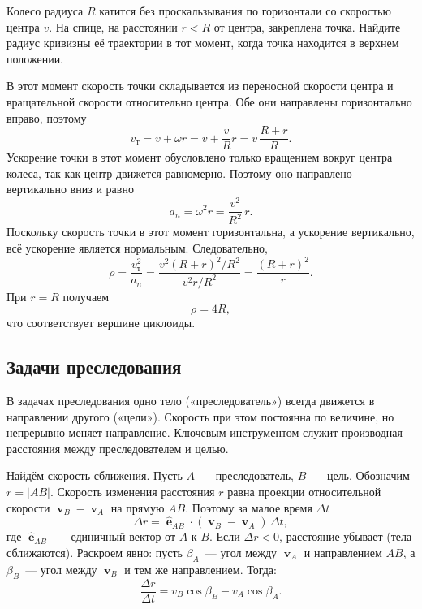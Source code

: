 \documentclass[../main.tex]{subfiles}
\begin{document}
\begin{example}
Колесо радиуса $R$ катится без проскальзывания по горизонтали со
скоростью центра $v$. На спице, на расстоянии $r < R$ от центра,
закреплена точка. Найдите радиус кривизны её траектории в тот момент,
когда точка находится в верхнем положении.

В этот момент скорость точки складывается из переносной скорости центра
и вращательной скорости относительно центра. Обе они направлены
горизонтально вправо, поэтому
\[
v_{\text{т}} = v + \omega r = v + \frac{v}{R}r = v\,\frac{R+r}{R}.
\]
Ускорение точки в этот момент обусловлено только вращением вокруг центра
колеса, так как центр движется равномерно. Поэтому оно направлено
вертикально вниз и равно
\[
a_n = \omega^2 r = \frac{v^2}{R^2}\,r.
\]
Поскольку скорость точки в этот момент горизонтальна, а ускорение
вертикально, всё ускорение является нормальным. Следовательно,
\[
\rho = \frac{v_{\text{т}}^2}{a_n}
= \frac{v^2 (R+r)^2/R^2}{v^2 r/R^2}
= \frac{(R+r)^2}{r}.
\]
При $r = R$ получаем
\[
\rho = 4R,
\]
что соответствует вершине циклоиды.
\end{example}

\subsection{Задачи преследования}

В задачах преследования одно тело («преследователь») всегда движется
в направлении другого («цели»). Скорость при этом постоянна по величине,
но непрерывно меняет направление. Ключевым инструментом служит
производная расстояния между преследователем и целью.

Найдём скорость сближения. Пусть $A$~--- преследователь, $B$~--- цель. Обозначим $r = |AB|$.
Скорость изменения расстояния $r$ равна проекции относительной скорости
$\mbfv_B - \mbfv_A$ на прямую $AB$. Поэтому за малое время $\Delta t$
\[
\Delta r = \hat{\mbfe}_{AB}\cdot(\mbfv_B - \mbfv_A)\,\Delta t,
\]
где $\hat{\mbfe}_{AB}$~--- единичный вектор от $A$ к $B$.
Если $\Delta r < 0$, расстояние убывает (тела сближаются).
Раскроем явно: пусть $\beta_A$~--- угол между $\mbfv_A$ и направлением $AB$,
а $\beta_B$~--- угол между $\mbfv_B$ и тем же направлением. Тогда:
\[
\frac{\Delta r}{\Delta t} = v_B\cos\beta_B - v_A\cos\beta_A.
\]
\end{document}
